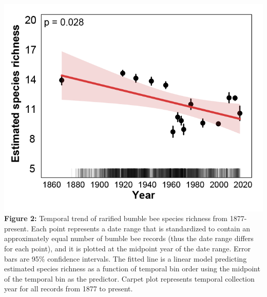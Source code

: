 \documentclass[11pt,]{article}
\begin{document}
\newpage

\includegraphics[width=1\textwidth,height=\textheight]{../ms_figs/fig_2.png}
\textbf{Figure 2:} Temporal trend of rarified bumble bee species
richness from 1877-present. Each point represents a date range that is
standardized to contain an approximately equal number of bumble bee
records (thus the date range differs for each point), and it is plotted
at the midpoint year of the date range. Error bars are 95\% confidence
intervals. The fitted line is a linear model predicting estimated
species richness as a function of temporal bin order using the midpoint
of the temporal bin as the predictor. Carpet plot represents temporal
collection year for all records from 1877 to present. \clearpage

\newpage
\end{document}
